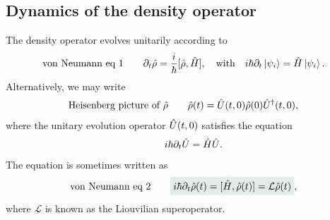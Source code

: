 \subsection{Dynamics of the density operator}
The density operator evolves unitarily according to 
\begin{align}
    \text{von Neumann eq 1}\qquad\partial_t\hat{\rho}=\frac{i}{\hbar}[\hat{\rho},\hat{H}],\quad\text{with}\quad i\hbar\partial_t\left|\psi_i\right\rangle=\hat{H}\left|\psi_i\right\rangle.
\end{align}
Alternatively, we may write 
\begin{align*}
    \text{Heisenberg picture of $\hat{\rho}$}\qquad\hat{\rho}(t)=\hat{U}(t,0)\hat{\rho}(0)\hat{U}^\dagger(t,0),
\end{align*}
where the unitary evolution operator $\hat{U}(t,0)$ satisfies the equation 
\begin{align}
    \qquad i\hbar\partial_t\hat{U}=\hat{H}\hat{U}.
\end{align}
The equation is sometimes written as 
\begin{align}
    \text{von Neumann eq 2}\qquad\highlight{i\hbar\partial_t\hrho(t)=[\hH,\hrho(t)]=\mathcal{L}\hrho(t)},
\end{align}
where $\mathcal{L}$ is known as the Liouvilian superoperator.